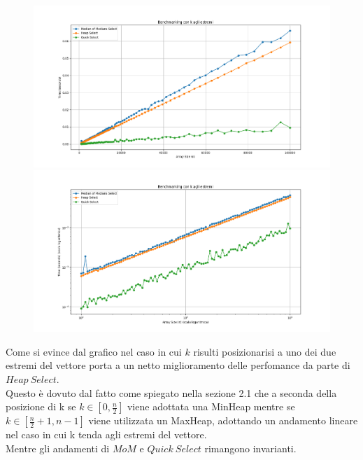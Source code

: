 \documentclass[a4paper]{article}
\begin{document}
\begin{figure}[h]
            \centering
            \includegraphics[width=.83\textwidth]{graphs/K_last_n.png}
            \includegraphics[width=.83\textwidth]{graphs/K_last_2xlog.png}
\end{figure}
Come si evince dal grafico nel caso in cui $k$ risulti posizionarisi a uno dei due estremi del vettore porta a un netto miglioramento delle perfomance da parte di $Heap\ Select$.\\
Questo è dovuto dal fatto come spiegato nella sezione 2.1 che a seconda della posizione di k se $k\in[0,\frac{n}{2}]$ viene adottata una MinHeap mentre se $k\in[\frac{n}{2}+1,n-1]$ viene utilizzata un MaxHeap, adottando un andamento lineare nel caso in cui k tenda agli estremi del vettore.\\
Mentre gli andamenti di $MoM$ e $Quick\ Select$ rimangono invarianti.\\
\newpage
\end{document}
